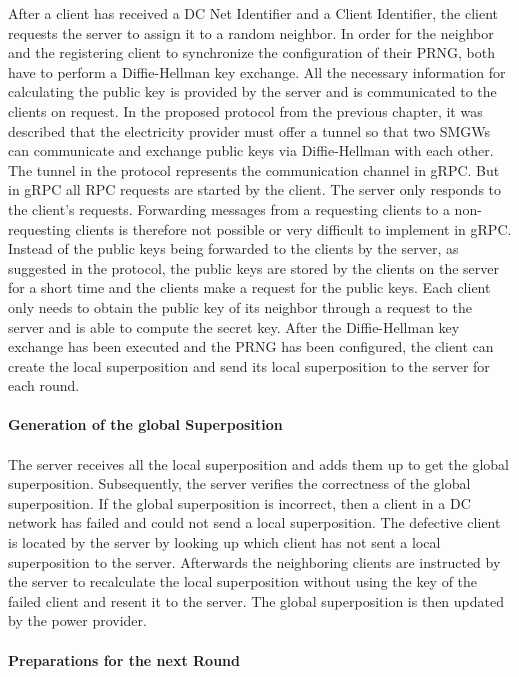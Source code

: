 After a client has received a DC Net Identifier and a Client Identifier, the client requests the server to assign it to a random neighbor. In order for the neighbor and the registering client to synchronize the configuration of their \gls{PRNG}, both have to perform a Diffie-Hellman key exchange. All the necessary information for calculating the public key is provided by the server and is communicated to the clients on request. In the proposed protocol from the previous chapter, it was described that the electricity provider must offer a tunnel so that two \gls{SMGW}s can communicate and exchange public keys via Diffie-Hellman with each other. The tunnel in the protocol represents the communication channel in gRPC. But in gRPC all \gls{RPC} requests are started by the client. The server only responds to the client's requests. Forwarding messages from a requesting clients to a non-requesting clients is therefore not possible or very difficult to implement in gRPC. Instead of the public keys being forwarded to the clients by the server, as suggested in the protocol, the public keys are stored by the clients on the server for a short time and the clients make a request for the public keys. 
Each client only needs to obtain the public key of its neighbor through a request to the server and is able to compute the secret key. After the Diffie-Hellman key exchange has been executed and the \gls{PRNG} has been configured, the client can create the local superposition and send its local superposition to the server for each round. 
\\
\\
\textbf{Generation of the global Superposition}
\\
\\
The server receives all the local superposition and adds them up to get the global superposition. Subsequently, the server verifies the correctness of the global superposition. If the global superposition is incorrect, then a client in a DC network has failed and could not send a local superposition. The defective client is located by the server by looking up which client has not sent a local superposition to the server. Afterwards the neighboring clients are instructed by the server to recalculate the local superposition without using the key of the failed client and resent it to the server. The global superposition is then updated by the power provider. \\
\\
\textbf{Preparations for the next Round}
\\
